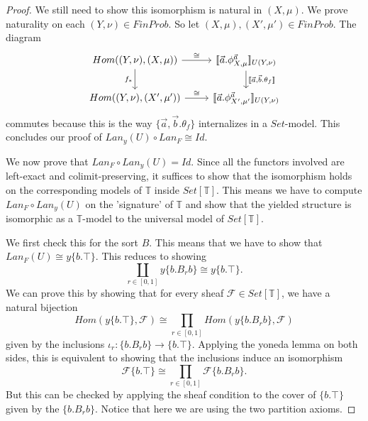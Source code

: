 \documentclass[a4paper]{amsproc}
\theoremstyle{plain}
\theoremstyle{definition}
\theoremstyle{remark}
\numberwithin{equation}{section}
\newcommand{\ldoub}{[\![ }
\newcommand{\rdoub}{]\!]}
\begin{document}
\begin{proof}
We still need to show this isomorphism is natural in $(X,\mu)$. We prove naturality on each $(Y,\nu) \in FinProb$. So let $(X,\mu), (X',\mu') \in FinProb$. The diagram
\[
\begin{tikzcd}
    {Hom((Y,\nu),(X,\mu))} \arrow[r, "\cong"] \arrow[d, "f_*"'] & {\ldoub \vec{a} . \phi^{\vec{a}}_{X,\mu} \rdoub_{U(Y,\nu)}} \arrow[d, "{\ldoub \vec{a},\vec{b} . \theta_f \rdoub}"] \\
    {Hom((Y,\nu),(X',\mu'))} \arrow[r, "\cong"]                 & {\ldoub \vec{a} . \phi^{\vec{a}}_{X',\mu'} \rdoub_{U(Y,\nu)}}                                             
\end{tikzcd}
\]
commutes because this is the way $\{\vec{a},\vec{b} . \theta_f \}$ internalizes in a $Set$-model. This concludes our proof of $Lan_y(U) \circ Lan_F \cong Id$.

We now prove that $Lan_F \circ Lan_y(U) = Id$. Since all the functors involved are left-exact and colimit-preserving, it suffices to show that the isomorphism holds on the corresponding models of $\mathbb{T}$ inside $Set[\mathbb{T}]$. This means we have to compute $Lan_F \circ Lan_y(U)$ on the 'signature' of $\mathbb{T}$ and show that the yielded structure is isomorphic as a $\mathbb{T}$-model to the universal model of $Set[\mathbb{T}]$.

We first check this for the sort $B$. This means that we have to show that $Lan_F(U) \cong y \{b . \top\}$. This reduces to showing
\[
\coprod_{r \in [0,1]} y \{b . B_r b\} \cong y \{b . \top\} .
\]
We can prove this by showing that for every sheaf $\mathcal{F} \in Set[\mathbb{T}]$, we have a natural bijection
\[
Hom(y \{b . \top\}, \mathcal{F}) \cong \prod_{r \in [0,1]} Hom(y \{b . B_r b\}, \mathcal{F})
\]
given by the inclusions $\iota_r : \{b . B_r b\} \to \{b . \top\}$. Applying the yoneda lemma on both sides, this is equivalent to showing that the inclusions induce an isomorphism
\[
\mathcal{F} \{b . \top\} \cong \prod_{r \in [0,1]} \mathcal{F} \{b . B_r b\} .
\]
But this can be checked by applying the sheaf condition to the cover of $\{b . \top\}$ given by the $\{b . B_r b\}$. Notice that here we are using the two partition axioms.


\end{proof}
\end{document}
